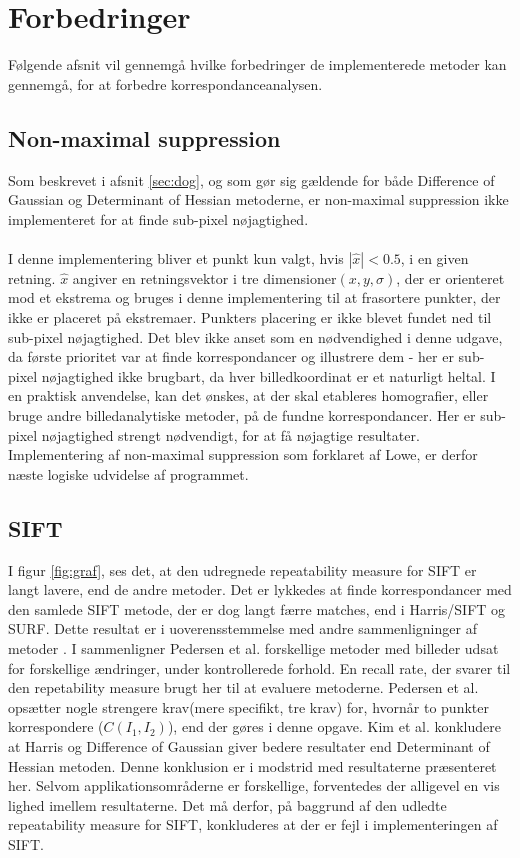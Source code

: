 \section{Forbedringer}
Følgende afsnit vil gennemgå hvilke forbedringer de implementerede metoder kan gennemgå, for at forbedre korrespondanceanalysen.
\subsection{Non-maximal suppression}
Som beskrevet i afsnit \ref{sec:dog}, og som gør sig gældende for både Difference of Gaussian og Determinant of Hessian metoderne,  er non-maximal suppression ikke implementeret for at finde sub-pixel nøjagtighed. 
\\
\\
I denne implementering bliver et punkt kun valgt, hvis $|\hat{x}| < 0.5$, i en given retning. $\hat{x}$ angiver en retningsvektor i tre dimensioner$(x, y, \sigma)$, der er orienteret mod et ekstrema og bruges i denne implementering til at frasortere punkter, der ikke er placeret på ekstremaer. Punkters placering er ikke blevet fundet ned til sub-pixel nøjagtighed. Det blev ikke anset som en nødvendighed i denne udgave, da første prioritet var at finde korrespondancer og illustrere dem - her er sub-pixel nøjagtighed ikke brugbart, da hver billedkoordinat er et naturligt heltal. I en praktisk anvendelse, kan det ønskes, at der skal etableres homografier, eller bruge andre billedanalytiske metoder, på de fundne korrespondancer. Her er sub-pixel nøjagtighed strengt nødvendigt, for at få nøjagtige resultater. Implementering af non-maximal suppression som forklaret af Lowe, er derfor næste logiske udvidelse af programmet. 

\subsection{SIFT}
I figur \ref{fig:graf}, ses det, at den udregnede repeatability measure for SIFT er langt lavere, end de andre metoder. Det er lykkedes at finde korrespondancer med den samlede SIFT metode, der er dog langt færre matches, end i Harris/SIFT og SURF. Dette resultat er i uoverensstemmelse med andre sammenligninger af metoder\cite{kim} \cite{kim2}. I \cite{kim} sammenligner Pedersen et al. forskellige metoder med billeder udsat for forskellige ændringer, under kontrollerede forhold. En recall rate, der svarer til den repetability measure brugt her til at evaluere metoderne. Pedersen et al. opsætter nogle strengere krav(mere specifikt, tre krav) for, hvornår to punkter korrespondere ($C(I_1, I_2)$), end der gøres i denne opgave. Kim et al. konkludere at Harris og Difference of Gaussian giver bedere resultater end Determinant of Hessian metoden. Denne konklusion er i modstrid med resultaterne præsenteret her. Selvom applikationsområderne er forskellige, forventedes der alligevel en vis lighed imellem resultaterne. Det må derfor, på baggrund af den udledte repeatability measure for SIFT, konkluderes at der er fejl i implementeringen af SIFT.
